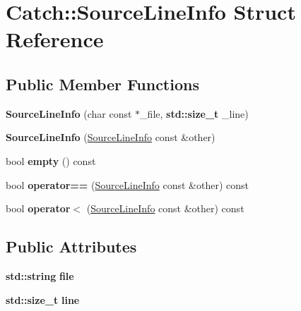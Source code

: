 \hypertarget{struct_catch_1_1_source_line_info}{}\section{Catch\+:\+:Source\+Line\+Info Struct Reference}
\label{struct_catch_1_1_source_line_info}
\subsection*{Public Member Functions}
\begin{DoxyCompactItemize}
\item 
\mbox{\label{struct_catch_1_1_source_line_info_a6218cb890337d37f708ea94063958940}} 
{\bfseries Source\+Line\+Info} (char const $\ast$\+\_\+file, \textbf{ std\+::size\+\_\+t} \+\_\+line)
\item 
\mbox{\label{struct_catch_1_1_source_line_info_a1ec99cc0547ce5909133aaa8f14ed4b1}} 
{\bfseries Source\+Line\+Info} (\hyperlink{struct_catch_1_1_source_line_info}{Source\+Line\+Info} const \&other)
\item 
\mbox{\label{struct_catch_1_1_source_line_info_a05ab6444e9de7e9c3e76d8aa00093c3a}} 
bool {\bfseries empty} () const
\item 
\mbox{\label{struct_catch_1_1_source_line_info_a688e761986879266658f000f14ab8a42}} 
bool {\bfseries operator==} (\hyperlink{struct_catch_1_1_source_line_info}{Source\+Line\+Info} const \&other) const
\item 
\mbox{\label{struct_catch_1_1_source_line_info_a8b99a0d7b1553d8c2298c694db924be3}} 
bool {\bfseries operator$<$} (\hyperlink{struct_catch_1_1_source_line_info}{Source\+Line\+Info} const \&other) const
\end{DoxyCompactItemize}
\subsection*{Public Attributes}
\begin{DoxyCompactItemize}
\item 
\mbox{\label{struct_catch_1_1_source_line_info_adf3ccf0c2bd326eb3466318af82a94dd}} 
\textbf{ std\+::string} {\bfseries file}
\item 
\mbox{\label{struct_catch_1_1_source_line_info_a841e5d696c7b9cde24e45e61dd979c77}} 
\textbf{ std\+::size\+\_\+t} {\bfseries line}
\end{DoxyCompactItemize}



